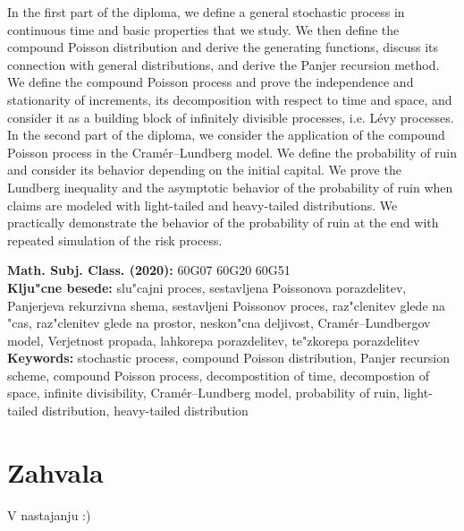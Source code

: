 \documentclass[12pt, a4paper, reqno]{amsart}
\theoremstyle{definition}
\theoremstyle{plain}
\newcommand{\1}{\mathds{1}}
\begin{document}
In the first part of the diploma, we define a general stochastic process in continuous time and 
basic properties that we study. We then define the compound Poisson distribution and derive the
generating functions, discuss its connection with general distributions, and derive the Panjer recursion method.
We define the compound Poisson process and prove the independence and stationarity of increments,
its decomposition with respect to time and space, and consider it as a building block of infinitely divisible
processes, i.e. Lévy processes.
In the second part of the diploma, we consider the application of the compound Poisson process in the Cramér--Lundberg model. 
We define the probability of ruin and consider its behavior depending on the initial capital. 
We prove the Lundberg inequality and the asymptotic behavior of the probability of ruin when claims 
are modeled with light-tailed and heavy-tailed distributions. We practically demonstrate the behavior 
of the probability of ruin at the end with repeated simulation of the risk process.


\vfill\noindent
{\bf Math. Subj. Class. (2020):} 60G07 60G20 60G51 \\[1mm]
{\bf Klju"cne besede:} slu"cajni proces, sestavljena Poissonova porazdelitev, Panjerjeva rekurzivna shema, 
sestavljeni Poissonov proces, raz"clenitev glede na "cas, raz"clenitev glede na prostor,
neskon"cna deljivost, Cramér--Lundbergov model, Verjetnost propada, lahkorepa porazdelitev, te"zkorepa porazdelitev\\[1mm]
{\bf Keywords:} stochastic process, compound Poisson distribution, Panjer recursion scheme, 
compound Poisson process, decompostition of time, decompostion of space, infinite divisibility,
Cramér--Lundberg model, probability of ruin, light-tailed distribution, heavy-tailed distribution
\pagebreak


\section*{Zahvala}
V nastajanju :)
%
\pagebreak
\end{document}
